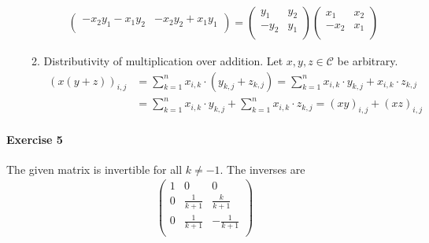 \documentclass{article}
\begin{document}
\begin{enumerate}
\begin{enumerate}[label={(\roman*)}]
\begin{align*}
\begin{pmatrix}
                -x_2y_1 - x_1y_2 & -x_2y_2 + x_1y_1 \\
            \end{pmatrix} =
            \begin{pmatrix}
                y_1 & y_2 \\ -y_2 & y_1 \\
            \end{pmatrix}
            \begin{pmatrix}
                x_1 & x_2 \\ -x_2 & x_1 \\
            \end{pmatrix}
        \end{align*}

        \item Distributivity of multiplication over addition. Let $x, y, z \in \mathcal{C}$ be arbitrary.
        \begin{align*}
            (x(y + z))_{i, j} &= \sum_{k = 1}^{n} x_{i, k} \cdot (y_{k, j} + z_{k, j}) = \sum_{k = 1}^{n} x_{i, k} \cdot y_{k, j} + x_{i, k} \cdot z_{k, j} \\ &= \sum_{k = 1}^{n} x_{i, k} \cdot y_{k, j} + \sum_{k = 1}^{n} x_{i, k} \cdot z_{k, j} = (xy)_{i, j} + (xz)_{i, j}
        \end{align*}
    \end{enumerate}
\end{enumerate}

\paragraph{Exercise 5}

The given matrix is invertible for all $k \neq -1$. The inverses are
\begin{align*}
    \begin{pmatrix}
        1 & 0 & 0 \\
        0 & \frac{1}{k + 1} & \frac{k}{k + 1} \\
        0 & \frac{1}{k + 1} & -\frac{1}{k + 1} \\
    \end{pmatrix}
\end{align*}


\end{document}
